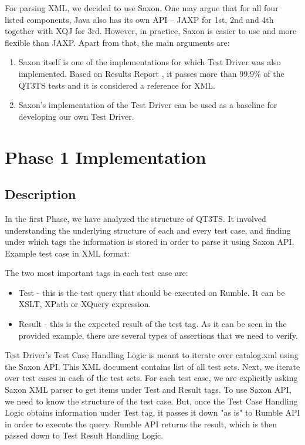 For parsing XML, we decided to use Saxon. One may argue that for all four listed components, Java also has its own API – JAXP for 1st, 2nd and 4th together with XQJ for 3rd. However, in practice, Saxon is easier to use and more flexible than JAXP. Apart from that, the main arguments are:
\begin{enumerate}
	\item Saxon itself is one of the implementations for which Test Driver was also implemented. Based on Results Report \cite{SaxonReport}, it passes more than 99,9\% of the QT3TS tests and it is considered a reference for XML.
	\item Saxon's implementation of the Test Driver can be used as a baseline for developing our own Test Driver. 
\end{enumerate}

\section{Phase 1 Implementation}
\subsection{Description}
\label{Phase1_Description}
In the first Phase, we have analyzed the structure of QT3TS. It involved understanding the underlying structure of each and every test case, and finding under which tags the information is stored in order to parse it using Saxon API. Example test case in XML format:



The two most important tags in each test case are:
\begin{itemize}
	\item Test  - this is the test query that should be executed on Rumble. It can be XSLT, XPath or XQuery expression.
	\item Result - this is the expected result of the test tag. As it can be seen in the provided example, there are several types of assertions that we need to verify.
\end{itemize}

Test Driver's Test Case Handling Logic is meant to iterate over catalog.xml using the Saxon API. This XML document contains list of all test sets. Next, we iterate over test cases in each of the test sets. For each test case, we are explicitly asking Saxon XML parser to get items under Test and Result tags. To use Saxon API, we need to know the structure of the test case. But, once the Test Case Handling Logic obtains information under Test tag, it passes it down "as is" to Rumble API in order to execute the query. Rumble API returns the result, which is then passed down to Test Result Handling Logic. 

